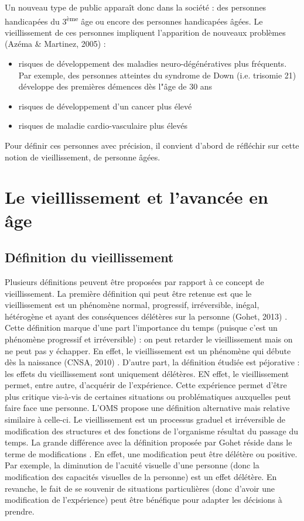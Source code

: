 Un nouveau type de public apparaît donc dans la société : des personnes handicapées du 3\textsuperscript{ème} âge ou encore des personnes handicapées âgées. 
Le vieillissement de ces personnes impliquent l'apparition de nouveaux problèmes (Azéma \& Martinez, 2005) \cite{AzemaMartinez2005}: 
\begin{itemize}
\item risques de développement des maladies neuro-dégénératives plus fréquents. Par exemple, des personnes atteintes du syndrome de Down (i.e. trisomie 21) développe des premières démences dès l"âge de 30 ans
\item risques de développement d'un cancer plus élevé
\item risques de maladie cardio-vasculaire plus élevés
\end{itemize}

Pour définir ces personnes avec précision, il convient d'abord de réfléchir sur cette notion de vieillissement, de personne âgées.

\section{Le vieillissement et l'avancée en âge}


\subsection{Définition du vieillissement}

Plusieurs définitions peuvent être proposées par rapport à ce concept de vieillissement.
La première définition qui peut être retenue est que le vieillissement est un phénomène normal, progressif, irréversible, inégal, hétérogène et ayant des conséquences délétères sur la personne (Gohet, 2013) \cite{Gohet2013}. Cette définition marque d'une part l'importance du temps (puisque c'est un phénomène progressif et irréversible) : on peut retarder le vieillissement mais on ne peut pas y échapper. En effet, le vieillissement est un phénomène qui débute dès la naissance (CNSA, 2010) \cite{CNSA2010}. D'autre part, la définition étudiée est péjorative : les effets du vieillissement sont uniquement délétères. EN effet, le vieillissement permet, entre autre, d'acquérir de l'expérience. Cette expérience permet d'être plus critique vis-à-vis de certaines situations ou problématiques auxquelles peut faire face une personne. L'OMS propose une définition alternative mais relative similaire à celle-ci. Le vieillissement est un \og processus graduel et irréversible de modification des structures et des fonctions de l'organisme résultat du passage du temps\fg{}. La grande différence avec la définition proposée par Gohet réside dans le terme de \og modifications \fg{}. En effet, une modification peut être délétère ou positive. Par exemple, la diminution de l'acuité visuelle d'une personne (donc la modification des capacités visuelles de la personne) est un effet délétère. En revanche, le fait de se souvenir de situations particulières (donc d'avoir une modification de l'expérience) peut être bénéfique pour adapter les décisions à prendre.  



